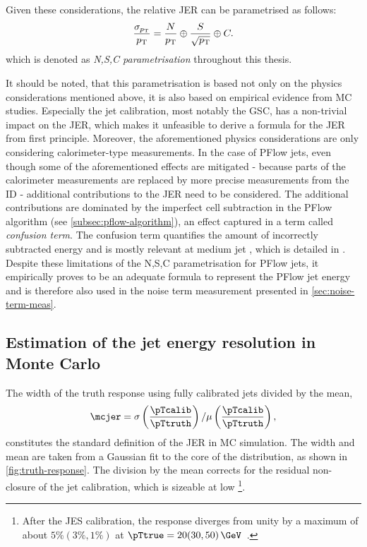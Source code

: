 Given these considerations, the relative JER can be parametrised as follows:
\begin{equation}
    \label{eq:jer-parametrisation}
    \frac{\sigma_{p_{\rm T}}}{p_{\rm T}} = \frac{N}{p_{\rm T}} \oplus \frac{S}{\sqrt{p_{\rm T}}} \oplus C.
\end{equation}
which is denoted as \emph{N,S,C parametrisation} throughout this thesis.


It should be noted, that this parametrisation is based not only on the physics considerations mentioned above, it is also based on empirical evidence from MC studies. Especially the jet calibration, most notably the GSC, has a non-trivial impact on the JER, which makes it unfeasible to derive a formula for the JER from first principle. 
Moreover, the aforementioned physics considerations are only considering calorimeter-type measurements. In the case of PFlow jets, even though some of the aforementioned effects are mitigated - because parts of the calorimeter measurements are replaced by more precise measurements from the ID - additional contributions to the JER need to be considered. The additional contributions are dominated by the imperfect cell subtraction in the PFlow algorithm (see \cref{subsec:pflow-algorithm}), an effect captured in a term called \emph{confusion term}. The confusion term quantifies the amount of incorrectly subtracted energy and is mostly relevant at medium jet \pT, which is detailed in .
Despite these limitations of the N,S,C parametrisation for PFlow jets, it empirically proves to be an adequate formula to represent the PFlow jet energy and is therefore also used in the noise term measurement presented in \cref{sec:noise-term-meas}. 




\subsection{Estimation of the jet energy resolution in Monte Carlo}
The width of the truth response using fully calibrated jets  divided by the mean,
\begin{equation}
    \mcjer = \sigma \left( \frac{\pTcalib}{\pTtruth} \right) / \mu \left( \frac{\pTcalib}{\pTtruth} \right),
\end{equation}
constitutes the standard definition of the JER in MC simulation. 
The width and mean are taken from a Gaussian fit to the core of the distribution, as shown in \cref{fig:truth-response}. The division by the mean corrects for the residual non-closure of the jet calibration, which is sizeable at low \pT\footnote{After the JES calibration, the response diverges from unity by a maximum of about $5\% (3\%, 1\%)$ at $\pTtrue = 20 (30, 50)\,\GeV$~\cite{JETM-2018-05}.}.

